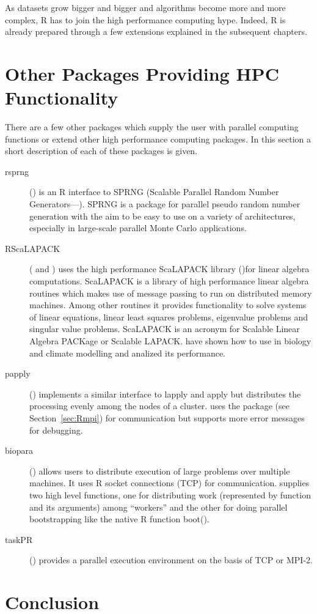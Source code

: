 As datasets grow bigger and bigger and algorithms become more and more
complex, R has to join the high performance computing hype. Indeed, R
is already prepared through a few extensions explained in the
subsequent chapters.









\section{Other Packages Providing HPC Functionality}

There are a few other packages which supply the user with parallel
computing functions or extend other high performance computing
packages. In this section a short description of each of these
packages is given.

\begin{description}
\item[rsprng] (\cite{li07rsprng}) is an R interface to SPRNG (Scalable Parallel Random
  Number Generators---\cite{mascagni00ssl}). SPRNG is a package for parallel
  pseudo random number generation with the aim to be easy to use on a
  variety of architectures, especially in large-scale parallel Monte
  Carlo applications.
\item[RScaLAPACK] (\cite{samatova05RSca} and \cite{yoginath05rhp})
  uses the high performance ScaLAPACK library
  (\cite{dongarra97sus})for linear algebra computations. ScaLAPACK is
  a library of high performance linear algebra routines which makes
  use of message passing to run on distributed memory machines. Among
  other routines it provides functionality to solve systems of linear equations, linear
  least squares problems, eigenvalue problems and singular value
  problems. ScaLAPACK is an acronym for Scalable Linear Algebra
  PACKage or Scalable LAPACK. \cite{samatova06hps} have shown how to
  use  in biology and climate modelling and analized
  its performance.
\item[papply] (\cite{currie05papply}) implements a similar interface
  to lapply and apply but distributes the processing evenly among the
  nodes of a cluster.  uses the package  (see
  Section~\ref{sec:Rmpi}) for
  communication but supports more error messages for debugging.
\item[biopara] (\cite{lazar06biopara}) allows users to distribute
  execution of large problems over multiple machines. It uses R socket
  connections (TCP) for communication.  supplies two high
  level functions, one for distributing work (represented by function
  and its arguments) among ``workers'' and the other for doing
  parallel bootstrapping like the native R function boot(). 
\item[taskPR] (\cite{samatova04taskPR}) provides a parallel execution environment on
  the basis of TCP or MPI-2.
\end{description}

\section{Conclusion}

